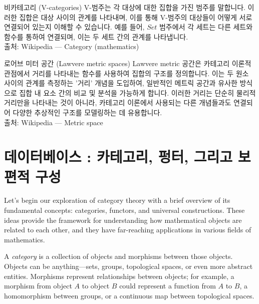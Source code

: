 \documentclass[11pt, a4paper, twoside, openany]{book}
\begin{document}
{\begin{deepresearch}{비카테고리 (V-categories)}
V-범주는 각 대상에 대한 집합을 가진 범주를 말합니다. 이러한 집합은 대상 사이의 관계를 나타내며, 이를 통해 V-범주의 대상들이 어떻게 서로 연결되어 있는지 이해할 수 있습니다. 예를 들어, $Set$ 범주에서 각 세트는 다른 세트와 함수를 통하여 연결되며, 이는 두 세트 간의 관계를 나타냅니다.
\\[4pt]{\footnotesize\color{ctgray} 출처: Wikipedia — Category (mathematics)}
\end{deepresearch}

\begin{deepresearch}{로어브 미터 공간 (Lawvere metric spaces)}
Lawvere metric 공간은 카테고리 이론적 관점에서 거리를 나타내는 함수를 사용하여 집합의 구조를 정의합니다.  이는 두 원소 사이의 관계를 측정하는 '거리' 개념을 도입하여, 일반적인 메트릭 공간과 유사한 방식으로 집합 내 요소 간의 비교 및 분석을 가능하게 합니다. 이러한 거리는 단순히 물리적 거리만을 나타내는 것이 아니라, 카테고리 이론에서 사용되는 다른 개념들과도 연결되어 다양한 추상적인 구조를 모델링하는 데 유용합니다.
\\[4pt]{\footnotesize\color{ctgray} 출처: Wikipedia — Metric space}
\end{deepresearch}


\chapter{데이터베이스 : 카테고리, 펑터, 그리고 보편적 구성}
\label{ch:3}
\vspace{12pt}

Let's begin our exploration of category theory with a brief overview of its fundamental concepts: categories, functors, and universal constructions.  These ideas provide the framework for understanding how mathematical objects are related to each other, and they have far-reaching applications in various fields of mathematics. 

\par\medskip
A \textit{category} is a collection of objects and morphisms between those objects. Objects can be anything—sets, groups, topological spaces, or even more abstract entities. Morphisms represent relationships between objects; for example, a morphism from object $A$ to object $B$ could represent a function from $A$ to $B$, a homomorphism between groups, or a continuous map between topological spaces.

}
\end{document}
